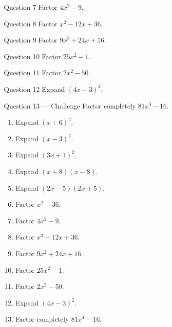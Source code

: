 \documentclass[11pt]{article}
\begin{document}
\begin{qbox}{Question 7}
Factor $4x^2-9$.\workspace{1.8cm}
\end{qbox}

\begin{qbox}{Question 8}
Factor $x^2-12x+36$.\workspace{1.8cm}
\end{qbox}

\begin{qbox}{Question 9}
Factor $9x^2+24x+16$.\workspace{2.0cm}
\end{qbox}

\begin{qbox}{Question 10}
Factor $25x^2-1$.\workspace{1.8cm}
\end{qbox}

\begin{qbox}{Question 11}
Factor $2x^2-50$.\workspace{2.0cm}
\end{qbox}

\begin{qbox}{Question 12}
Expand $(4x-3)^2$.\workspace{1.8cm}
\end{qbox}

\begin{qbox}{Question 13 --- Challenge}
Factor completely $81x^4-16$.\workspace{2.6cm}
\end{qbox}

\clearpage
{}

\begin{recapbox}
\begin{multicols}{2}
\small
\begin{enumerate}[leftmargin=*,itemsep=3pt]
  \item Expand $(x+6)^2$.
  \item Expand $(x-3)^2$.
  \item Expand $(3x+1)^2$.
  \item Expand $(x+8)(x-8)$.
  \item Expand $(2x-5)(2x+5)$.
  \item Factor $x^2-36$.
  \item Factor $4x^2-9$.
  \item Factor $x^2-12x+36$.
  \item Factor $9x^2+24x+16$.
  \item Factor $25x^2-1$.
  \item Factor $2x^2-50$.
  \item Expand $(4x-3)^2$.
  \item Factor completely $81x^4-16$.
\end{enumerate}
\end{multicols}
\end{recapbox}
\end{document}
